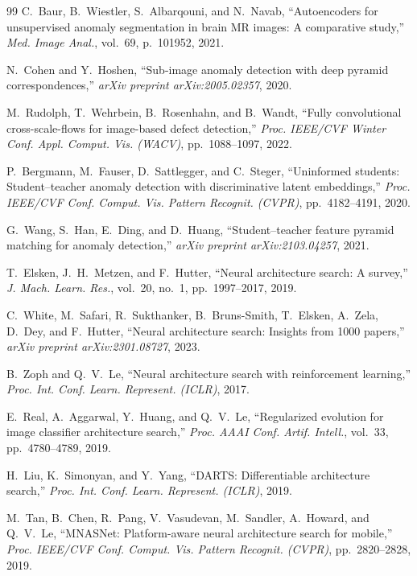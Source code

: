 \documentclass[journal]{IEEEtran}
\begin{document}
\begin{thebibliography}{99}
C.~Baur, B.~Wiestler, S.~Albarqouni, and N.~Navab,
``Autoencoders for unsupervised anomaly segmentation in brain MR images: A comparative study,''
\textit{Med. Image Anal.}, vol.~69, p.~101952, 2021.

N.~Cohen and Y.~Hoshen,
``Sub-image anomaly detection with deep pyramid correspondences,''
\textit{arXiv preprint arXiv:2005.02357}, 2020.

M.~Rudolph, T.~Wehrbein, B.~Rosenhahn, and B.~Wandt,
``Fully convolutional cross-scale-flows for image-based defect detection,''
\textit{Proc. IEEE/CVF Winter Conf. Appl. Comput. Vis. (WACV)}, pp.~1088--1097, 2022.

P.~Bergmann, M.~Fauser, D.~Sattlegger, and C.~Steger,
``Uninformed students: Student--teacher anomaly detection with discriminative latent embeddings,''
\textit{Proc. IEEE/CVF Conf. Comput. Vis. Pattern Recognit. (CVPR)}, pp.~4182--4191, 2020.

G.~Wang, S.~Han, E.~Ding, and D.~Huang,
``Student--teacher feature pyramid matching for anomaly detection,''
\textit{arXiv preprint arXiv:2103.04257}, 2021.

T.~Elsken, J.~H.~Metzen, and F.~Hutter,
``Neural architecture search: A survey,''
\textit{J. Mach. Learn. Res.}, vol.~20, no.~1, pp.~1997--2017, 2019.

C.~White, M.~Safari, R.~Sukthanker, B.~Bruns-Smith, T.~Elsken, A.~Zela,
D.~Dey, and F.~Hutter,
``Neural architecture search: Insights from 1000 papers,''
\textit{arXiv preprint arXiv:2301.08727}, 2023.

B.~Zoph and Q.~V.~Le,
``Neural architecture search with reinforcement learning,''
\textit{Proc. Int. Conf. Learn. Represent. (ICLR)}, 2017.

E.~Real, A.~Aggarwal, Y.~Huang, and Q.~V.~Le,
``Regularized evolution for image classifier architecture search,''
\textit{Proc. AAAI Conf. Artif. Intell.}, vol.~33, pp.~4780--4789, 2019.

H.~Liu, K.~Simonyan, and Y.~Yang,
``DARTS: Differentiable architecture search,''
\textit{Proc. Int. Conf. Learn. Represent. (ICLR)}, 2019.

M.~Tan, B.~Chen, R.~Pang, V.~Vasudevan, M.~Sandler, A.~Howard, and Q.~V.~Le,
``MNASNet: Platform-aware neural architecture search for mobile,''
\textit{Proc. IEEE/CVF Conf. Comput. Vis. Pattern Recognit. (CVPR)}, pp.~2820--2828, 2019.


\end{thebibliography}
\end{document}
